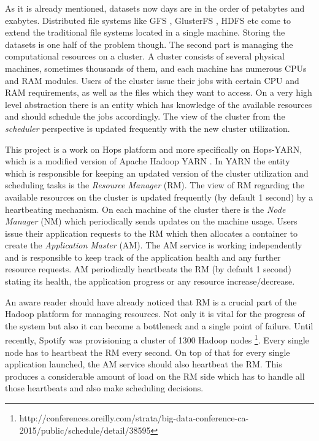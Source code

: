 As it is already mentioned, datasets now days are in the order of
petabytes and exabytes. Distributed file systems like GFS
\cite{Ghemawat:2003:GFS:1165389.945450}, 
GlusterFS \cite{glusterfs}, HDFS \cite{hdfs} etc come to extend
the traditional file systems located in a single machine. Storing the
datasets is one half of the problem though. The second part is
managing the computational resources on a cluster. A cluster consists
of several physical machines, sometimes thousands of them, and each
machine has numerous CPUs and RAM modules. Users of the cluster issue
their jobs with certain CPU and RAM requirements, as well as the files
which they want to access. On a very high level abstraction there is
an entity which has knowledge of the available resources and should
schedule the jobs accordingly. The view of the cluster from the
\emph{scheduler} perspective is updated frequently with the new
cluster utilization.

This project is a work on Hops \cite{hops} platform
and more specifically on Hops-YARN, which is a modified version of
Apache Hadoop YARN \cite{Vavilapalli:2013:AHY:2523616.2523633}. In YARN the
entity which is responsible for keeping an updated version of the
cluster utilization and scheduling tasks is the \emph{Resource
Manager} (RM). The view of RM regarding the available resources on the
cluster is updated frequently (by default 1 second) by a heartbeating
mechanism. On each machine of the cluster there is the \emph{Node
Manager} (NM) which periodically sends updates on the machine
usage. Users issue their application requests to the RM which then
allocates a container to create the \emph{Application Master}
(AM). The AM service is working independently and is responsible to
keep track of the application health and any further resource
requests. AM periodically heartbeats the RM (by default 1 second)
stating its health, the application progress or any resource
increase/decrease.

An aware reader should have already noticed that RM is a crucial part
of the Hadoop platform for managing resources. Not only it is vital
for the progress of the system but also it can become a
bottleneck and a single point of failure. Until recently, Spotify was
provisioning a cluster of 1300
Hadoop nodes \footnote{http://conferences.oreilly.com/strata/big-data-conference-ca-2015/public/schedule/detail/38595}. Every single node has to heartbeat the RM every
second. On top of that for every single application launched, the AM
service should also heartbeat the RM. This produces a considerable
amount of load on the RM side which has to handle all those heartbeats
and also make scheduling decisions.

